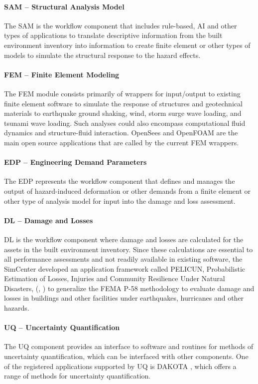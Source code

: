 \paragraph{SAM – Structural Analysis Model} The SAM is the workflow component that includes rule-based, AI and other types of applications to translate descriptive information from the built environment inventory into information to create finite element or other types of models to simulate the structural response to the hazard effects. 

\paragraph{FEM – Finite Element Modeling} The FEM module consists primarily of wrappers for input/output to  existing finite element software to simulate the response of structures and geotechnical materials to earthquake ground shaking, wind, storm surge wave loading, and tsunami wave loading.  Such analyses could also encompass computational fluid dynamics and structure-fluid interaction.  OpenSees  and OpenFOAM  are the main open source applications that are called by the current FEM wrappers.

\paragraph{EDP – Engineering Demand Parameters} The EDP represents the workflow component that defines and manages the output of hazard-induced deformation or other demands from a finite element or other type of analysis model for input into the damage and loss assessment.

\paragraph{DL – Damage and Losses}  DL is the workflow component where damage and losses are calculated for the assets in the built environment inventory. Since these calculations are essential to all performance assessments and not readily available in existing software, the SimCenter developed an application framework called PELICUN, Probabilistic Estimation of Losses, Injuries and Community Resilience Under Natural Disasters, (\cite{zsarnoczay2020pelicun}, ) to generalize the FEMA P-58 methodology to evaluate damage and losses in buildings and other facilities under earthquakes, hurricanes and other hazards. 

\paragraph{UQ – Uncertainty Quantification} The UQ component provides an interface to software and routines for methods of uncertainty quantification, which can be interfaced with other components.  One of the registered applications supported by UQ is DAKOTA \citep{adams2009dakota}, which offers a range of methods for uncertainty quantification.

